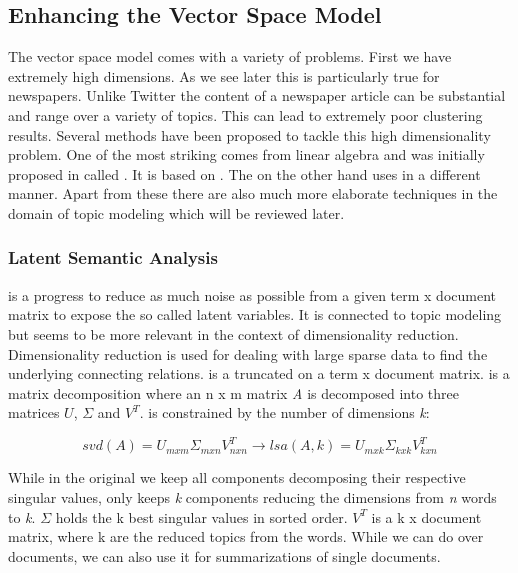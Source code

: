   \subsection{Enhancing the Vector Space Model}
  \label{sec:evsm}

    The vector space model comes with a variety of problems. First we have extremely high dimensions. As we see later this is particularly true for newspapers. Unlike Twitter the content of a newspaper article can be substantial and range over a variety of topics. This can lead to extremely poor clustering results. Several methods have been proposed to tackle this high dimensionality problem. One of the most striking comes from linear algebra and was initially proposed in \cite{DeerwesterLSI1990} called \lsafull{}. It is based on \svdfull{}. The \pcafull{} on the other hand uses \svd{} in a different manner. Apart from these there are also much more elaborate techniques in the domain of topic modeling which will be reviewed later.

    \subsubsection{Latent Semantic Analysis}
    \label{sec:lsa}
      \lsalong{} is a progress to reduce as much noise as possible from a given term x document matrix to expose the so called latent variables. It is connected to topic modeling but seems to be more relevant in the context of dimensionality reduction. Dimensionality reduction is used for dealing with large sparse data to find the underlying connecting relations. \lsa{} is a truncated \svdfull{} on a term x document matrix. \svd{} is a matrix decomposition where an n x m matrix \emph{A} is decomposed into three matrices $U$, $\Sigma$ and $V^{T}$. \lsa{} is constrained by the number of dimensions \emph{k}:

      \begin{equation}
        svd(A) = U_{mxm}\Sigma_{mxn} V^{T}_{nxn} \to lsa(A, k) = U_{mxk}\Sigma_{kxk} V^{T}_{kxn}
      \end{equation}

      While in the original \svd{} we keep all components decomposing their respective singular values, \lsa{} only keeps \emph{k} components reducing the dimensions from \emph{n} words to \emph{k}. $\Sigma$ holds the k best singular values in sorted order. $V^{T}$ is a k x document matrix, where k are the reduced topics from the words. While we can do \lsa{} over documents, we can also use it for summarizations of single documents.

